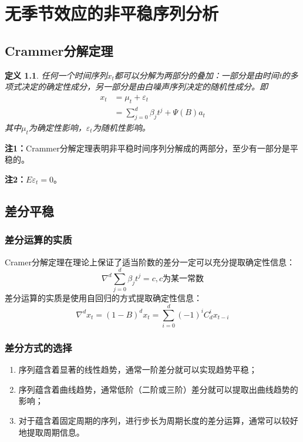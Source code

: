 \documentclass[12pt, a4paper, oneside]{ctexbook}
\newtheorem{definition}[theorem]{定义}
\begin{document}
\chapter{无季节效应的非平稳序列分析}
\section{Crammer分解定理}
\begin{definition}
    任何一个时间序列${x_t}$都可以分解为两部分的叠加：一部分是由时间t的多项式决定的确定性成分，另一部分是由白噪声序列决定的随机性成分。即
    \begin{equation}
        \begin{aligned}
            x_t & ={\mu}_t+\varepsilon_t               \\
                & =\sum_{j=0}^d\beta_jt^j + \Psi(B)a_t
        \end{aligned}
    \end{equation}
    其中$\mu_t$为确定性影响，$\varepsilon_t$为随机性影响。
\end{definition}

\textbf{注1：}Crammer分解定理表明非平稳时间序列分解成的两部分，至少有一部分是平稳的。

\textbf{注2：}$E \varepsilon_t = 0$。
\section{差分平稳}
\subsection{差分运算的实质}
Cramer分解定理在理论上保证了适当阶数的差分一定可以充分提取确定性信息：
$$
    \nabla^d\sum_{j=0}^d\beta_jt^j=c,c\text{为某一常数}
$$
差分运算的实质是使用自回归的方式提取确定性信息：
$$
    \nabla^dx_t=(1-B)^dx_t=\sum_{i=0}^d(-1)^iC_d^ix_{t-i}
$$

\subsection{差分方式的选择}
\begin{enumerate}[1、]
    \item 序列蕴含着显著的线性趋势，通常一阶差分就可以实现趋势平稳；
    \item 序列蕴含着曲线趋势，通常低阶（二阶或三阶）差分就可以提取出曲线趋势的影响；
    \item 对于蕴含着固定周期的序列，进行步长为周期长度的差分运算，通常可以较好地提取周期信息。
\end{enumerate}
\end{document}
